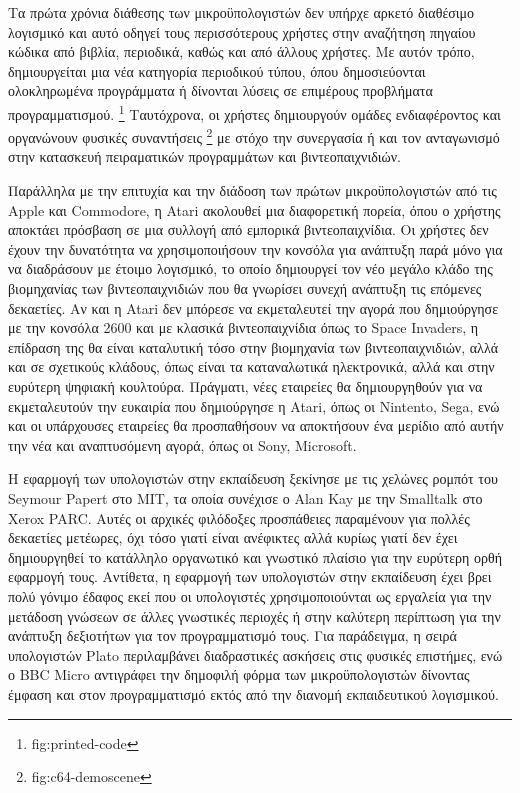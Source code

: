 \documentclass[
]{article}
\begin{document}
Τα πρώτα χρόνια διάθεσης των μικροϋπολογιστών δεν υπήρχε αρκετό
διαθέσιμο λογισμικό και αυτό οδηγεί τους περισσότερους χρήστες στην
αναζήτηση πηγαίου κώδικα από βιβλία, περιοδικά, καθώς και από άλλους
χρήστες. Με αυτόν τρόπο, δημιουργείται μια νέα κατηγορία περιοδικού
τύπου, όπου δημοσιεύονται ολοκληρωμένα προγράμματα ή δίνονται λύσεις σε
επιμέρους προβλήματα προγραμματισμού. \footnote{fig:printed-code}
Ταυτόχρονα, οι χρήστες δημιουργούν ομάδες ενδιαφέροντος και οργανώνουν
φυσικές συναντήσεις \footnote{fig:c64-demoscene} με στόχο την συνεργασία
ή και τον ανταγωνισμό στην κατασκευή πειραματικών προγραμμάτων και
βιντεοπαιχνιδιών.

Παράλληλα με την επιτυχία και την διάδοση των πρώτων μικροϋπολογιστών
από τις Apple και Commodore, η Atari ακολουθεί μια διαφορετική πορεία,
όπου ο χρήστης αποκτάει πρόσβαση σε μια συλλογή από εμπορικά
βιντεοπαιχνίδια. Οι χρήστες δεν έχουν την δυνατότητα να χρησιμοποιήσουν
την κονσόλα για ανάπτυξη παρά μόνο για να διαδράσουν με έτοιμο
λογισμικό, το οποίο δημιουργεί τον νέο μεγάλο κλάδο της βιομηχανίας των
βιντεοπαιχνιδιών που θα γνωρίσει συνεχή ανάπτυξη τις επόμενες δεκαετίες.
Αν και η Atari δεν μπόρεσε να εκμεταλευτεί την αγορά που δημιούργησε με
την κονσόλα 2600 και με κλασικά βιντεοπαιχνίδια όπως το Space Invaders,
η επίδραση της θα είναι καταλυτική τόσο στην βιομηχανία των
βιντεοπαιχνιδιών, αλλά και σε σχετικούς κλάδους, όπως είναι τα
καταναλωτικά ηλεκτρονικά, αλλά και στην ευρύτερη ψηφιακή κουλτούρα.
Πράγματι, νέες εταιρείες θα δημιουργηθούν για να εκμεταλευτούν την
ευκαιρία που δημιούργησε η Atari, όπως οι Nintento, Sega, ενώ και οι
υπάρχουσες εταιρείες θα προσπαθήσουν να αποκτήσουν ένα μερίδιο από αυτήν
την νέα και αναπτυσόμενη αγορά, όπως οι Sony, Microsoft.

Η εφαρμογή των υπολογιστών στην εκπαίδευση ξεκίνησε με τις χελώνες
ρομπότ του Seymour Papert στο ΜΙΤ, τα οποία συνέχισε ο Alan Kay με την
Smalltalk στο Xerox PARC. Αυτές οι αρχικές φιλόδοξες προσπάθειες
παραμένουν για πολλές δεκαετίες μετέωρες, όχι τόσο γιατί είναι ανέφικτες
αλλά κυρίως γιατί δεν έχει δημιουργηθεί το κατάλληλο οργανωτικό και
γνωστικό πλαίσιο για την ευρύτερη ορθή εφαρμογή τους. Αντίθετα, η
εφαρμογή των υπολογιστών στην εκπαίδευση έχει βρει πολύ γόνιμο έδαφος
εκεί που οι υπολογιστές χρησιμοποιούνται ως εργαλεία για την μετάδοση
γνώσεων σε άλλες γνωστικές περιοχές ή στην καλύτερη περίπτωση για την
ανάπτυξη δεξιοτήτων για τον προγραμματισμό τους. Για παράδειγμα, η σειρά
υπολογιστών Plato περιλαμβάνει διαδραστικές ασκήσεις στις φυσικές
επιστήμες, ενώ ο BBC Micro αντιγράφει την δημοφιλή φόρμα των
μικροϋπολογιστών δίνοντας έμφαση και στον προγραμματισμό εκτός από την
διανομή εκπαιδευτικού λογισμικού.
\end{document}
